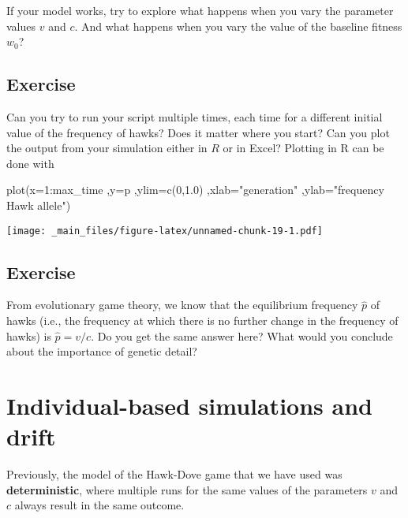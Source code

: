 \documentclass[
]{book}
\newenvironment{Shaded}{\begin{snugshade}}{\end{snugshade}}
\newcommand{\AttributeTok}[1]{\textcolor[rgb]{0.77,0.63,0.00}{#1}}
\newcommand{\DecValTok}[1]{\textcolor[rgb]{0.00,0.00,0.81}{#1}}
\newcommand{\FloatTok}[1]{\textcolor[rgb]{0.00,0.00,0.81}{#1}}
\newcommand{\FunctionTok}[1]{\textcolor[rgb]{0.00,0.00,0.00}{#1}}
\newcommand{\NormalTok}[1]{#1}
\newcommand{\SpecialCharTok}[1]{\textcolor[rgb]{0.00,0.00,0.00}{#1}}
\newcommand{\StringTok}[1]{\textcolor[rgb]{0.31,0.60,0.02}{#1}}
\begin{document}
If your model works, try to explore what happens when you vary the parameter values \(v\) and \(c\). And what happens when you vary the value of the baseline fitness \(w_{0}\)?

\hypertarget{exercise-4}{%
\section{Exercise}\label{exercise-4}}

Can you try to run your script multiple times, each time for a different initial value of the frequency of hawks? Does it matter where you start? Can you plot the output from your simulation either in \(R\) or in Excel?
Plotting in R can be done with

\begin{Shaded}
\begin{Highlighting}[]
\FunctionTok{plot}\NormalTok{(}\AttributeTok{x=}\DecValTok{1}\SpecialCharTok{:}\NormalTok{max\_time}
\NormalTok{     ,}\AttributeTok{y=}\NormalTok{p}
\NormalTok{     ,}\AttributeTok{ylim=}\FunctionTok{c}\NormalTok{(}\DecValTok{0}\NormalTok{,}\FloatTok{1.0}\NormalTok{)}
\NormalTok{     ,}\AttributeTok{xlab=}\StringTok{"generation"}
\NormalTok{     ,}\AttributeTok{ylab=}\StringTok{"frequency Hawk allele"}\NormalTok{)}
\end{Highlighting}
\end{Shaded}

\texttt{[image: \_main\_files/figure-latex/unnamed-chunk-19-1.pdf]}

\hypertarget{exercise-5}{%
\section{Exercise}\label{exercise-5}}

From evolutionary game theory, we know that the equilibrium frequency \(\hat{p}\) of hawks (i.e., the frequency at which there is no further change in the frequency of hawks) is \(\hat{p} = v/c\). Do you get the same answer here? What would you conclude about the importance of genetic detail?

\hypertarget{individual-based-simulations-and-drift}{%
\chapter{Individual-based simulations and drift}\label{individual-based-simulations-and-drift}}

Previously, the model of the Hawk-Dove game that we have used was \textbf{deterministic}, where multiple runs for the same values of the parameters \(v\) and \(c\) always result in the same outcome.
\end{document}
